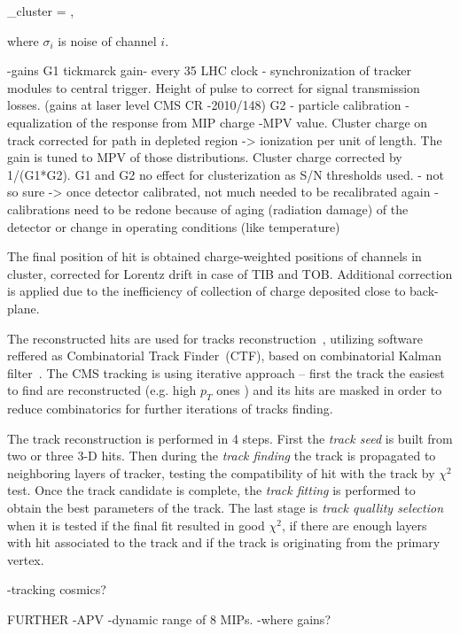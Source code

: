 {
    \sigma_{cluster} = ,
}

where $\sigma_{i}$ is noise of channel $i$.

-gains %
G1 tickmarck gain- every 35 LHC clock - synchronization of tracker modules to central trigger. Height of pulse to correct for signal transmission losses. (gains at laser level CMS CR -2010/148)
G2 - particle calibration - equalization of the response from MIP charge -MPV value. Cluster charge on track corrected for path in depleted region -> ionization per unit of length. The gain is tuned to MPV of those distributions. Cluster charge corrected by 1/(G1*G2).
G1 and G2 no effect for clusterization as S/N thresholds used. - not so sure
-> once detector calibrated, not much needed to be recalibrated again - calibrations need to be redone because of aging (radiation damage) of the detector or change in operating conditions (like temperature)

The final position of hit is obtained charge-weighted positions of channels in cluster, corrected for Lorentz drift in case of TIB and TOB. Additional correction is applied due to the inefficiency of collection of charge deposited close to back-plane.

The reconstructed hits are used for tracks reconstruction~\cite{Chatrchyan:2014fea}, utilizing software reffered as Combinatorial Track Finder~(CTF), based on combinatorial Kalman filter~\cite{Fruhwirth:1987fm}. The CMS tracking is using iterative approach -- first the track the easiest to find are reconstructed (e.g. high $p_{T}$ ones ) and its hits are masked in order to reduce combinatorics for further iterations of tracks finding.


The track reconstruction is performed in 4 steps. First the \textit{track seed} is built from two or three 3-D hits. Then during the \textit{track finding} the track is propagated to neighboring layers of tracker, testing the compatibility of hit with the track by $\chi^{2}$ test. Once the track candidate is complete, the \textit{track fitting} is performed to obtain the best parameters of the track. The last stage is \textit{track quallity selection} when it is tested if the final fit resulted in good $\chi^{2}$, if there are enough layers with hit associated to the track and if the track is originating from the primary vertex.

-tracking cosmics?

FURTHER
-APV -dynamic range of 8 MIPs.
-where gains?
